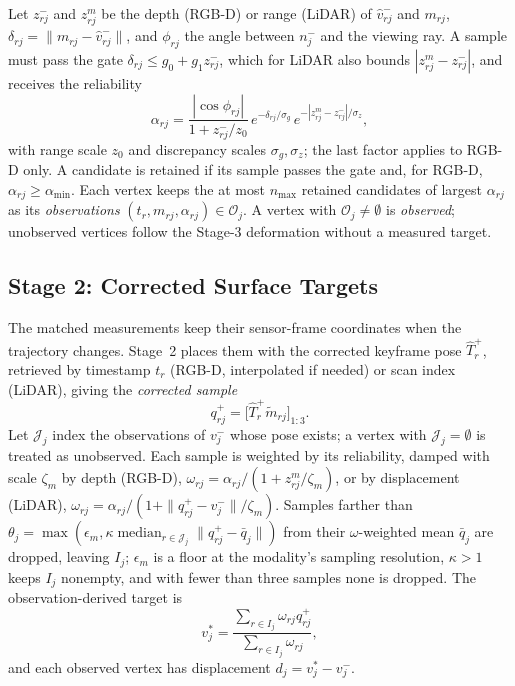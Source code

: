 Let $z_{rj}^-$ and $z_{rj}^m$ be the depth (RGB-D) or range (LiDAR) of
$\hat v_{rj}^-$ and $m_{rj}$, $\delta_{rj}=\|m_{rj}-\hat v_{rj}^-\|$, and
$\phi_{rj}$ the angle between $n_j^-$ and the viewing ray. A sample must
pass the gate $\delta_{rj}\le g_0+g_1z_{rj}^-$, which for LiDAR also bounds
$|z_{rj}^m-z_{rj}^-|$, and receives the reliability
\begin{equation}
\alpha_{rj}=\frac{|\cos\phi_{rj}|}{1+z_{rj}^-/z_0}\,
e^{-\delta_{rj}/\sigma_g}\,e^{-|z_{rj}^m-z_{rj}^-|/\sigma_z},
\label{eq:alpha}
\end{equation}
with range scale $z_0$ and discrepancy scales $\sigma_g,\sigma_z$; the last
factor applies to RGB-D only. A candidate is retained if its sample passes
the gate and, for RGB-D, $\alpha_{rj}\ge\alpha_{\min}$. Each vertex keeps the
at most $n_{\max}$ retained candidates of largest $\alpha_{rj}$ as its
\emph{observations} $(t_r,m_{rj},\alpha_{rj})\in\mathcal O_j$. A vertex with
$\mathcal O_j\neq\emptyset$ is \emph{observed}; unobserved vertices follow
the Stage-3 deformation without a measured target.

\subsection{Stage 2: Corrected Surface Targets}
\label{sec:stage2}

The matched measurements keep their sensor-frame coordinates when the
trajectory changes. Stage~2 places them with the corrected keyframe pose
$\widehat T_r^+$, retrieved by timestamp $t_r$ (RGB-D, interpolated if
needed) or scan index (LiDAR), giving the \emph{corrected sample}
\begin{equation}
q_{rj}^+=\bigl[\widehat T_r^+\widetilde m_{rj}\bigr]_{1:3}.
\label{eq:corrected_target}
\end{equation}
Let $\mathcal J_j$ index the observations of $v_j^-$ whose pose exists; a
vertex with $\mathcal J_j=\emptyset$ is treated as unobserved. Each sample is
weighted by its reliability, damped with scale $\zeta_m$ by depth (RGB-D),
$\omega_{rj}=\alpha_{rj}/(1+z_{rj}^m/\zeta_m)$, or by displacement (LiDAR),
$\omega_{rj}=\alpha_{rj}/(1+\|q_{rj}^+-v_j^-\|/\zeta_m)$. Samples farther than
$\theta_j=\max(\epsilon_m,\kappa\operatorname{median}_{r\in\mathcal J_j}\|q_{rj}^+-\bar q_j\|)$
from their $\omega$-weighted mean $\bar q_j$ are dropped, leaving $I_j$;
$\epsilon_m$ is a floor at the modality's sampling resolution,
$\kappa>1$ keeps $I_j$ nonempty, and with fewer than three samples none is
dropped. The observation-derived target is
\begin{equation}
v_j^*=\frac{\sum_{r\in I_j}\omega_{rj}q_{rj}^+}{\sum_{r\in I_j}\omega_{rj}},
\label{eq:target}
\end{equation}
and each observed vertex has displacement $d_j=v_j^*-v_j^-$.

